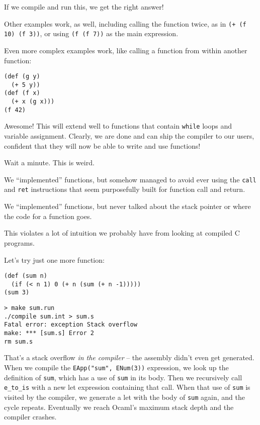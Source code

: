 \documentclass[10pt, oneside]{article}
\begin{document}
If we compile and run this, we get the right answer!

Other examples work, as well, including calling the function twice, as in
\texttt{(+ (f 10) (f 3))}, or using \texttt{(f (f 7))} as the main
expression.

Even more complex examples work, like calling a function from within another
function:

\begin{lstlisting}
(def (g y)
  (+ 5 y))
(def (f x)
  (+ x (g x)))
(f 42)
\end{lstlisting}



Awesome! This will extend well to functions that contain \texttt{while} loops
and variable assignment. Clearly, we are done and can ship the compiler to
our users, confident that they will now be able to write and use functions!

\vspace{10em}

Wait a minute. This is weird.

We ``implemented'' functions, but somehow managed to avoid ever using the
\texttt{call} and \texttt{ret} instructions that seem purposefully built for
function call and return.

We ``implemented'' functions, but never talked about the stack pointer or
where the code for a function goes.

This violates a lot of intuition we probably have from looking at compiled C
programs.

Let's try just one more function:

\begin{lstlisting}
(def (sum n)
  (if (< n 1) 0 (+ n (sum (+ n -1)))))
(sum 3)
\end{lstlisting}

\begin{verbatim}
> make sum.run
./compile sum.int > sum.s
Fatal error: exception Stack overflow
make: *** [sum.s] Error 2
rm sum.s
\end{verbatim}

That's a stack overflow {\it in the compiler} -- the assembly didn't even get
generated. When we compile the \texttt{EApp("sum", ENum(3))} expression, we
look up the definition of {\tt sum}, which has a use of {\tt sum} in its
body. Then we recursively call {\tt e\_to\_is} with a new let expression
containing that call. When that use of {\tt sum} is visited by the compiler,
we generate a let with the body of {\tt sum} again, and the cycle repeats.
Eventually we reach Ocaml's maximum stack depth and the compiler crashes.
\end{document}
